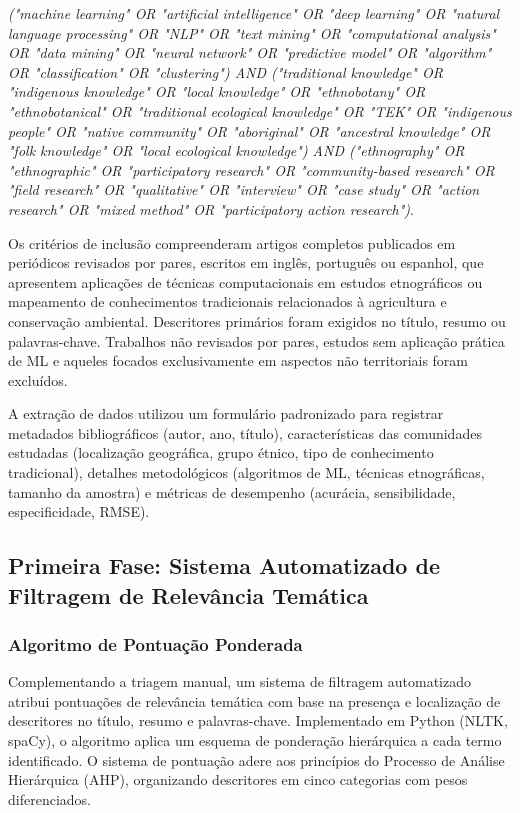 \textit{("machine learning" OR "artificial intelligence" OR "deep learning" OR "natural language processing" OR "NLP" OR "text mining" OR "computational analysis" OR "data mining" OR "neural network" OR "predictive model" OR "algorithm" OR "classification" OR "clustering") AND ("traditional knowledge" OR "indigenous knowledge" OR "local knowledge" OR "ethnobotany" OR "ethnobotanical" OR "traditional ecological knowledge" OR "TEK" OR "indigenous people" OR "native community" OR "aboriginal" OR "ancestral knowledge" OR "folk knowledge" OR "local ecological knowledge") AND ("ethnography" OR "ethnographic" OR "participatory research" OR "community-based research" OR "field research" OR "qualitative" OR "interview" OR "case study" OR "action research" OR "mixed method" OR "participatory action research")}.



Os critérios de inclusão compreenderam artigos completos publicados em periódicos revisados por pares, escritos em inglês, português ou espanhol, que apresentem aplicações de técnicas computacionais em estudos etnográficos ou mapeamento de conhecimentos tradicionais relacionados à agricultura e conservação ambiental. Descritores primários foram exigidos no título, resumo ou palavras-chave. Trabalhos não revisados por pares, estudos sem aplicação prática de ML e aqueles focados exclusivamente em aspectos não territoriais foram excluídos.

A extração de dados utilizou um formulário padronizado para registrar metadados bibliográficos (autor, ano, título), características das comunidades estudadas (localização geográfica, grupo étnico, tipo de conhecimento tradicional), detalhes metodológicos (algoritmos de ML, técnicas etnográficas, tamanho da amostra) e métricas de desempenho (acurácia, sensibilidade, especificidade, RMSE).

\subsection{Primeira Fase: Sistema Automatizado de Filtragem de Relevância Temática}

\subsubsection{Algoritmo de Pontuação Ponderada}

Complementando a triagem manual, um sistema de filtragem automatizado atribui pontuações de relevância temática com base na presença e localização de descritores no título, resumo e palavras-chave. Implementado em Python (NLTK, spaCy), o algoritmo aplica um esquema de ponderação hierárquica a cada termo identificado. O sistema de pontuação adere aos princípios do Processo de Análise Hierárquica (AHP), organizando descritores em cinco categorias com pesos diferenciados.


